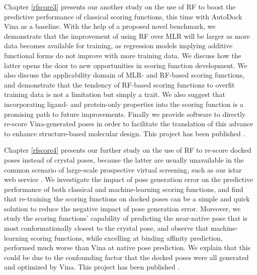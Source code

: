 Chapter \ref{rfscore3} presents our another study on the use of RF to boost the predictive performance of classical scoring functions, this time with AutoDock Vina \citep{595} as a baseline. With the help of a proposed novel benchmark, we demonstrate that the improvement of using RF over MLR will be larger as more data becomes available for training, as regression models implying additive functional forms do not improve with more training data. We discuss how the latter opens the door to new opportunities in scoring function development. We also discuss the applicability domain of MLR- and RF-based scoring functions, and demonstrate that the tendency of RF-based scoring functions to overfit training data is not a limitation but simply a trait. We also suggest that incorporating ligand- and protein-only properties into the scoring function is a promising path to future improvements. Finally we provide software to directly re-score Vina-generated poses in order to facilitate the translation of this advance to enhance structure-based molecular design. This project has been published \citep{1433}.

Chapter \ref{rfscore4} presents our further study on the use of RF to re-score docked poses instead of crystal poses, because the latter are usually unavailable in the common scenario of large-scale prospective virtual screening, such as our istar web service \citep{1362}. We investigate the impact of pose generation error on the predictive performance of both classical and machine-learning scoring functions, and find that re-training the scoring functions on docked poses can be a simple and quick solution to reduce the negative impact of pose generation error. Moreover, we study the scoring functions' capability of predicting the near-native pose that is most conformationally closest to the crystal pose, and observe that machine-learning scoring functions, while excelling at binding affinity prediction, performed much worse than Vina at native pose prediction. We explain that this could be due to the confounding factor that the docked poses were all generated and optimized by Vina. This project has been published \citep{1434}.

